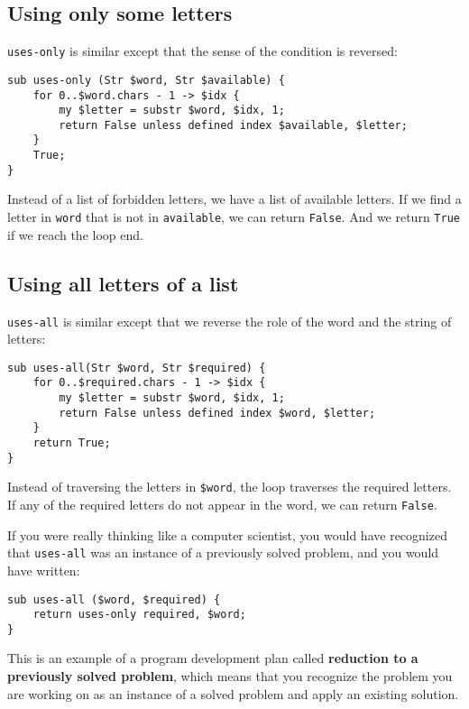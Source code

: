 \subsection{Using only some letters}

\verb"uses-only" is similar except that the sense of the 
condition is reversed:

\begin{verbatim}
sub uses-only (Str $word, Str $available) {
    for 0..$word.chars - 1 -> $idx {
        my $letter = substr $word, $idx, 1;
        return False unless defined index $available, $letter;
    }
    True;
}
\end{verbatim}
%
Instead of a list of forbidden letters, we have a list 
of available letters.  If we find a letter in {\tt word} that 
is not in {\tt available}, we can return {\tt False}. And 
we return {\tt True} if we reach the loop end.

\subsection{Using all letters of a list}

\verb"uses-all" is similar except that we reverse the role
of the word and the string of letters:

\begin{verbatim}
sub uses-all(Str $word, Str $required) {
    for 0..$required.chars - 1 -> $idx {
        my $letter = substr $word, $idx, 1;
        return False unless defined index $word, $letter;
    }
    return True;
}
\end{verbatim}
%
Instead of traversing the letters in {\tt \$word}, the loop
traverses the required letters.  If any of the required letters
do not appear in the word, we can return {\tt False}.

If you were really thinking like a computer scientist, you would
have recognized that \verb"uses-all" was an instance of a
previously solved problem, and you would have written:

\begin{verbatim}
sub uses-all ($word, $required) {
    return uses-only required, $word;
}
\end{verbatim}
%
This is an example of a program development plan called 
{\bf reduction to a previously solved problem}, which means that you
recognize the problem you are working on as an instance of a solved
problem and apply an existing solution. 

